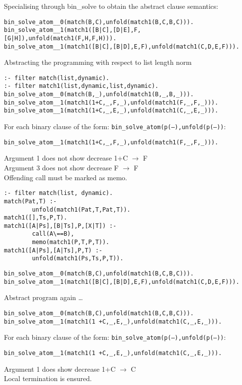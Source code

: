 \documentclass[12pt,twoside]{article}
\begin{document}
Specialising through bin\_solve to obtain the abstract clause semantics:
\begin{verbatim}
bin_solve_atom__0(match(B,C),unfold(match1(B,C,B,C))).
bin_solve_atom__1(match1([B|C],[D|E],F,[G|H]),unfold(match1(F,H,F,H))).
bin_solve_atom__1(match1([B|C],[B|D],E,F),unfold(match1(C,D,E,F))).
\end{verbatim}

Abstracting the programming with respect to list length norm
\begin{verbatim}
:- filter match(list,dynamic).
:- filter match1(list,dynamic,list,dynamic).
bin_solve_atom__0(match(B,_),unfold(match1(B,_,B,_))).
bin_solve_atom__1(match1(1+C,_,F,_),unfold(match1(F,_,F,_))).
bin_solve_atom__1(match1(1+C,_,E,_),unfold(match1(C,_,E,_))).
\end{verbatim}

For each binary clause of the form: {\tt bin\_solve\_atom(p(--),unfold(p(--))}:
\begin{verbatim}
bin_solve_atom__1(match1(1+C,_,F,_),unfold(match1(F,_,F,_))).
\end{verbatim}
Argument 1 does not show decrease 1+C $\to$ F \\
Argument 3 does not show decrease F $\to$ F \\
Offending call must be marked as memo.

\begin{verbatim}
:- filter match(list, dynamic).
match(Pat,T) :-
        unfold(match1(Pat,T,Pat,T)).
match1([],Ts,P,T).
match1([A|Ps],[B|Ts],P,[X|T]) :-
        call(A\==B),
        memo(match1(P,T,P,T)).
match1([A|Ps],[A|Ts],P,T) :-
        unfold(match1(Ps,Ts,P,T)).
\end{verbatim}

\begin{verbatim}
bin_solve_atom__0(match(B,C),unfold(match1(B,C,B,C))).
bin_solve_atom__1(match1([B|C],[B|D],E,F),unfold(match1(C,D,E,F))).
\end{verbatim}

Abstract program again \ldots
\begin{verbatim}
bin_solve_atom__0(match(B,C),unfold(match1(B,C,B,C))).
bin_solve_atom__1(match1(1 +C,_,E,_),unfold(match1(C,_,E,_))).
\end{verbatim}

For each binary clause of the form: {\tt bin\_solve\_atom(p(--),unfold(p(--))}:
\begin{verbatim}
bin_solve_atom__1(match1(1 +C,_,E,_),unfold(match1(C,_,E,_))).
\end{verbatim}
Argument 1 does show decrease 1+C $\to$ C \\
Local termination is ensured.




%
\end{document}
